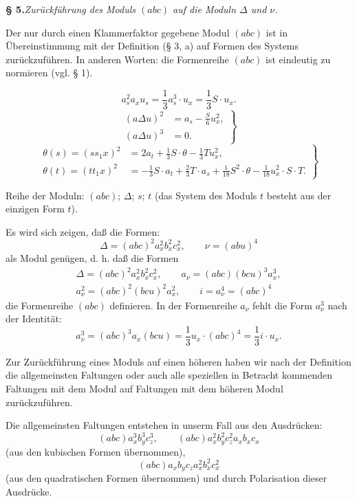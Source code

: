 \begin{center}
\textbf{§ 5.}\quad\emph{Zurückführung des Moduls $(abc)$ auf die Moduln $\Delta$ und $\nu$.}
\end{center}

Der nur durch einen Klammerfaktor gegebene Modul $(abc)$ ist in Übereinstimmung mit der Definition (§ 3, a) auf Formen des Systems zurückzuführen. In anderen Worten: die Formenreihe $(abc)$ ist eindeutig zu normieren (vgl. § 1).

\[
a_s^2a_xu_s=\frac13a_s^3\cdot u_x=\frac13S\cdot u_x. \tag{2.}
\]
\[
\left.
\begin{aligned}
(a\Delta u)^2&=a_s-\frac{S}{6}u_x^2,\\
(a\Delta u)^3&=0.
\end{aligned}
\right\} \tag{3.}
\]
\[
\left.
\begin{aligned}
\theta(s)=(ss_1x)^2&=2a_t+\frac13S\cdot\theta-\frac13Tu_x^2,\\
\theta(t)=(tt_1x)^2&=-\frac13S\cdot a_t+\frac23T\cdot a_s+\frac1{18}S^2\cdot\theta-\frac1{18}u_x^2\cdot S\cdot T.
\end{aligned}
\right\} \tag{4.}
\]

Reihe der Moduln: $(abc)$; $\Delta$; $s$; $t$ (das System des Moduls $t$ besteht aus der einzigen Form $t$).

Es wird sich zeigen, daß die Formen:
\[
\Delta=(abc)^2a_x^2b_x^2c_x^2,\qquad \nu=(abu)^4
\]
als Modul genügen, d. h. daß die Formen
\[
\begin{gathered}
\Delta=(abc)^2a_x^2b_x^2c_x^2,
\qquad a_\nu=(abc)(bcu)^3a_x^3,\\
a_\nu^2=(abc)^2(bcu)^2a_x^2,
\qquad i=a_\nu^4=(abc)^4
\end{gathered}
\]
die Formenreihe $(abc)$ definieren. In der Formenreihe $a_\nu$ fehlt die Form $a_\nu^3$ nach der Identität:
\[
a_\nu^3=(abc)^3a_x(bcu)=\frac13u_x\cdot(abc)^4=\frac13i\cdot u_x.
\]

Zur Zurückführung eines Moduls auf einen höheren haben wir nach der Definition die allgemeinsten Faltungen oder auch alle speziellen in Betracht kommenden Faltungen mit dem Modul auf Faltungen mit dem höheren Modul zurückzuführen.

Die allgemeinsten Faltungen entstehen in unserm Fall aus den Ausdrücken:
\[
(abc)a_x^3b_y^3c_z^3,
\qquad
(abc)a_x^2b_y^2c_z^2a_xb_xc_x
\]
(aus den kubischen Formen übernommen),
\[
(abc)a_xb_yc_za_x^2b_x^2c_x^2
\]
(aus den quadratischen Formen übernommen) und durch Polarisation dieser Ausdrücke.


